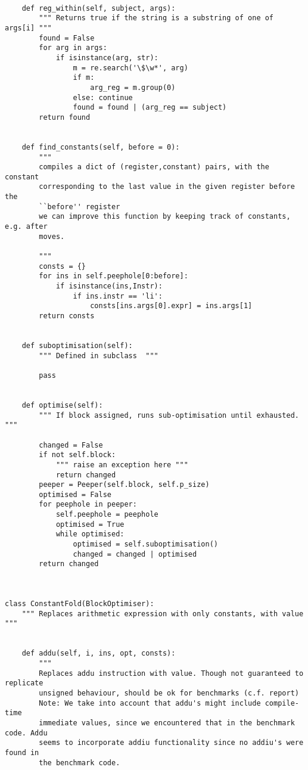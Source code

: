 \begin{lstlisting}
    
    def reg_within(self, subject, args):
        """ Returns true if the string is a substring of one of args[i] """
        found = False
        for arg in args:
            if isinstance(arg, str):
                m = re.search('\$\w*', arg)
                if m:
                    arg_reg = m.group(0)
                else: continue
                found = found | (arg_reg == subject)
        return found


    def find_constants(self, before = 0):
        """ 
        compiles a dict of (register,constant) pairs, with the constant
        corresponding to the last value in the given register before the
        ``before'' register 
        we can improve this function by keeping track of constants, e.g. after
        moves.
        
        """
        consts = {}
        for ins in self.peephole[0:before]:
            if isinstance(ins,Instr):
                if ins.instr == 'li':
                    consts[ins.args[0].expr] = ins.args[1]
        return consts


    def suboptimisation(self):
        """ Defined in subclass  """

        pass


    def optimise(self):
        """ If block assigned, runs sub-optimisation until exhausted. """

        changed = False
        if not self.block: 
            """ raise an exception here """
            return changed
        peeper = Peeper(self.block, self.p_size)
        optimised = False
        for peephole in peeper:
            self.peephole = peephole
            optimised = True
            while optimised:
                optimised = self.suboptimisation()
                changed = changed | optimised
        return changed



class ConstantFold(BlockOptimiser):
    """ Replaces arithmetic expression with only constants, with value """


    def addu(self, i, ins, opt, consts):
        """ 
        Replaces addu instruction with value. Though not guaranteed to replicate
        unsigned behaviour, should be ok for benchmarks (c.f. report)
        Note: We take into account that addu's might include compile-time
        immediate values, since we encountered that in the benchmark code. Addu
        seems to incorporate addiu functionality since no addiu's were found in
        the benchmark code.
        

\end{lstlisting}
